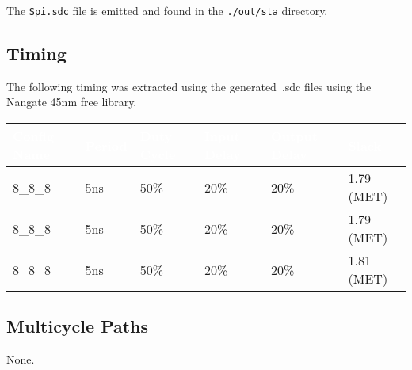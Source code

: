 The \texttt{Spi.sdc} file is emitted and found in the
\texttt{./out/sta} directory.

\subsection{Timing}

The following timing was extracted using the generated~.sdc files using the
Nangate 45nm free library.

\renewcommand*{\arraystretch}{1.4}
\begin{longtable}[H]{
    | p{}
    | p{}
    | p{}
    | p{}
    | p{}
    | p{} |
  }
  \hline
  \rowcolor{dark-gray}
  \textcolor{white}{\textbf{Config Name}}   &
  \textcolor{white}{\textbf{Period}}        &
  \textcolor{white}{\textbf{Duty Cycle}}    &
  \textcolor{white}{\textbf{Input Delay}}   &
  \textcolor{white}{\textbf{Output Delay}}  &
  \textcolor{white}{\textbf{Slack}}           \\ \hline \hline

  8\_8\_8     &
  5ns                    &
  50\%                   &
  20\%                   &
  20\%                   &
  1.79 (MET)               \\ \hline

  8\_8\_8  &
  5ns                    &
  50\%                   &
  20\%                   &
  20\%                   &
  1.79 (MET)               \\ \hline

  8\_8\_8  &
  5ns                    &
  50\%                   &
  20\%                   &
  20\%                   &
  1.81 (MET)               \\ \hline

  
\end{longtable}
\captionsetup{aboveskip=0pt}
\label{table:timing}
\endgroup

\subsection{Multicycle Paths}
None.
